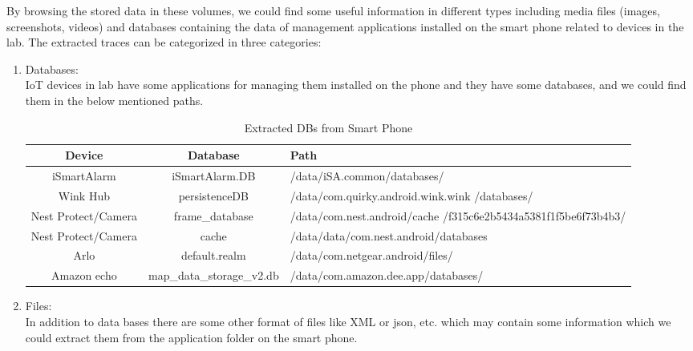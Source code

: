 \documentclass{easychair}
\begin{document}
By browsing the stored data in these volumes, we could find some useful information in different types including media files (images, screenshots, videos) and databases containing the data of management applications installed on the smart phone related to devices in the lab. 
The extracted traces can be categorized in three categories:
\begin{enumerate}
\item Databases:\\
IoT devices in lab have some applications for managing them installed on the phone and they have some databases, and we could find them in the below mentioned paths.\\
\begin{table}[]

   
\begin{tabular}{|c|c|m{6cm}|}

\hline
Device & Database & Path  \\
\hline
 iSmartAlarm & iSmartAlarm.DB & /data/iSA.common/databases/\\
\hline                    
 Wink Hub & persistenceDB & /data/com.quirky.android.wink.wink /databases/\\
\hline
Nest Protect/Camera & frame\_database & /data/com.nest.android/cache /f315c6e2b5434a5381f1f5be6f73b4b3/ \\
\hline 
Nest Protect/Camera & cache & /data/data/com.nest.android/databases\\
\hline
 Arlo & default.realm & /data/com.netgear.android/files/\\
\hline
Amazon echo & map\_data\_storage\_v2.db	& 	/data/com.amazon.dee.app/databases/\\
\hline 
\end{tabular}
 \caption{Extracted DBs from Smart Phone}
    \label{tab:my_label}
\end{table}
\item Files:\\
In addition to data bases there are some other format of files like XML or json, etc. which may contain some information which we could extract them from the application folder on the smart phone.\\

   
\begin{table}[]
   

\end{table}
\end{enumerate}
\end{document}
